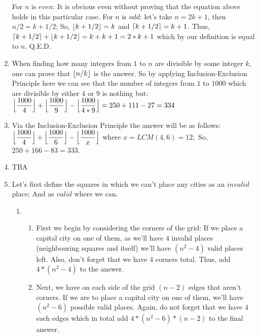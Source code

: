 \documentclass[12pt]{article}
\DeclarePairedDelimiter{\ceil}{\lceil}{\rceil}
\DeclarePairedDelimiter{\floor}{\lfloor}{\rfloor}
\begin{document}
\begin{enumerate}
    For $n$ is $even$: It is obvious even without proving that the equation above holds in this particular case. \newline
    For $n$ is $odd$: let's take $n = 2k + 1$, then $n/2 = k + 1/2$; \newline
    So, $\floor{k + 1/2} = k$ and $\ceil{k + 1/2} = k + 1$. \newline
    Thus, $\ceil{k + 1/2} + \floor{k + 1/2} = k + k + 1 = 2*k + 1$ which by our definition is equal to $n$. \newline Q.E.D.
  \item
    When finding how many integers from $1$ to $n$ are divisible by some integer $k$, one can prove that $\floor{n/k}$ is the answer. \newline \newline
    So by applying Inclusion-Exclusion Principle here we can see that the number of integers from $1$ to $1000$ which are divisible by either $4$ or $9$ is nothing but: \newline
    $\floor[\Big]{\dfrac{1000}{4}} + \floor[\Big]{\dfrac{1000}{9}} - \floor[\Big]{\dfrac{1000}{4*9}} = 250 + 111 - 27 = 334$
  \item
    Via the Inclusion-Exclusion Principle the answer will be as follows: \newline
    $\floor[\Big]{\dfrac{1000}{4}} + \floor[\Big]{\dfrac{1000}{6}} - \floor[\Big]{\dfrac{1000}{x}}$ where $x = LCM(4, 6) = 12;$ \newline \newline
    So, $250 + 166 - 83 = 333$.
  \item
    TBA
  \item
    Let's first define the squares in which we can't place any cities as an $invalid$ place; And as $valid$ where we can.
    \begin{enumerate}
      \item
        \begin{enumerate}
          \item First we begin by considering the corners of the grid: \newline
            If we place a capital city on one of them, as we'll have $4$ invalid places (neighbouring squares and itself) we'll have $(n^2 - 4)$ valid places left. Also, don't forget that we have $4$ corners total. Thus, add $4 * (n^2 - 4)$ to the answer.
          \item Next, we have on each side of the grid $(n - 2)$ edges that aren't corners. If we are to place a capital city on one of them, we'll have $(n^2 - 6)$ possible valid places. Again, do not forget that we have $4$ such edges which in total add $4 * (n^2 - 6) * (n - 2)$ to the final answer.

\end{enumerate}
\end{enumerate}
\end{enumerate}
\end{document}
